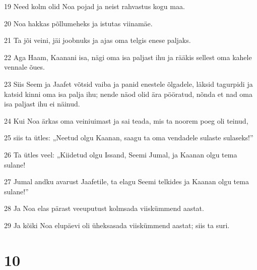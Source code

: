 \par 19 Need kolm olid Noa pojad ja neist rahvastus kogu maa.
\par 20 Noa hakkas põllumeheks ja istutas viinamäe.
\par 21 Ta jõi veini, jäi joobnuks ja ajas oma telgis enese paljaks.
\par 22 Aga Haam, Kaanani isa, nägi oma isa paljast ihu ja rääkis sellest oma kahele vennale õues.
\par 23 Siis Seem ja Jaafet võtsid vaiba ja panid enestele õlgadele, läksid tagurpidi ja katsid kinni oma isa palja ihu; nende näod olid ära pööratud, nõnda et nad oma isa paljast ihu ei näinud.
\par 24 Kui Noa ärkas oma veiniuimast ja sai teada, mis ta noorem poeg oli teinud,
\par 25 siis ta ütles: „Neetud olgu Kaanan, saagu ta oma vendadele sulaste sulaseks!”
\par 26 Ta ütles veel: „Kiidetud olgu Issand, Seemi Jumal, ja Kaanan olgu tema sulane!
\par 27 Jumal andku avarust Jaafetile, ta elagu Seemi telkides ja Kaanan olgu tema sulane!”
\par 28 Ja Noa elas pärast veeuputust kolmsada viiskümmend aastat.
\par 29 Ja kõiki Noa elupäevi oli üheksasada viiskümmend aastat; siis ta suri.

\chapter{10}

